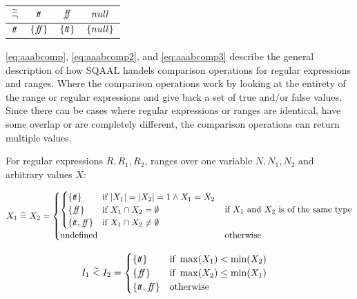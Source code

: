 \begin{table}[H]
    \centering
    \begin{tabular}{c|ccc}
        $\widetilde{\widetilde{\neg}}$ & $t\!t$ & $f\!\!f$ & $null$ \\
        \hline
        $t\!t$ & $\{f\!\!f\}$ & $\{t\!t\}$ & $\{null\}$ \\
    \end{tabular}
    \label{tab:aaabneg}
\end{table}



\autoref{eq:aaabcomp}, \autoref{eq:aaabcomp2}, and \autoref{eq:aaabcomp3} describe the general description of how SQAAL handels comparison operations for regular expressions and ranges. Where the comparison operations work by looking at the entirety of the range or regular expressions and give back a set of true and/or false values.
Since there can be cases where regular expressions or ranges are identical, have some overlap or are completely different, the comparison operations can return multiple values.


For regular expressions $R, R_1, R_2$, ranges over one variable $N, N_1, N_2$ and arbitrary values $X$:

\begin{align} \label{eq:aaabcomp}
    X_1 \;\aab{=}\; X_2 &= \begin{cases}
        \begin{cases}
        \{\true \} & \text{if } |X_1| = |X_2| = 1 \land X_1 = X_2 \\
        \{\false\} & \text{if } X_1 \cap X_2 = \emptyset \\
        \{\true, \false\} & \text{if } X_1 \cap X_2 \neq \emptyset
        \end{cases} & \text{if $X_1$ and $X_2$ is of the same type} \\
        \text{undefined} & \text{otherwise} 
    \end{cases} \\
\end{align}

\begin{align}\label{eq:aaabcomp2}
    I_1 \;\aab{<}\; I_2 &= \begin{cases}
        \{\true\} & \text{if } \max(X_1) < \min(X_2) \\
        \{\false\} & \text{if } \max(X_2) \leq \min (X_1) \\
        \{\true, \false\} & \text{otherwise}
    \end{cases}
\end{align}

